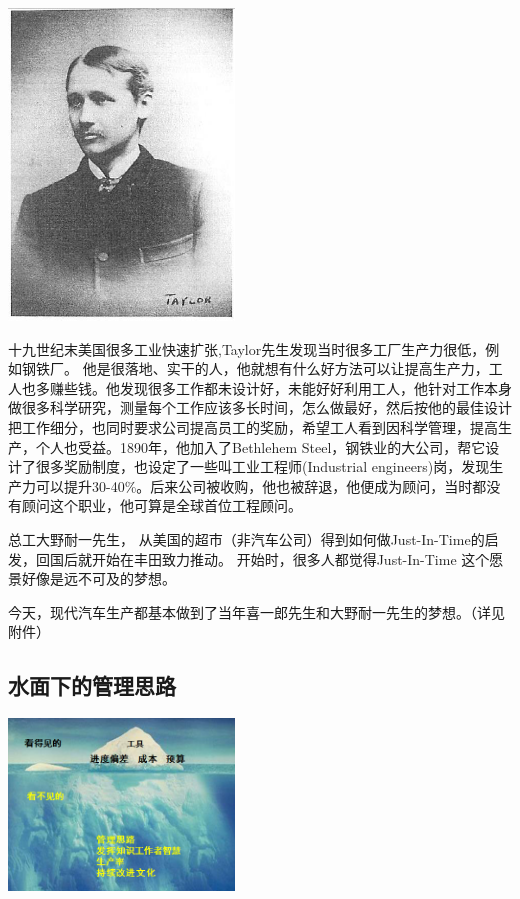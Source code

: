 {\begin{minipage}[t]{0.97\columnwidth}
\includegraphics[width=6cm]{Weisbord_P34.jpg}

十九世纪末美国很多工业快速扩张,Taylor先生发现当时很多工厂生产力很低，例如钢铁厂。
他是很落地、实干的人，他就想有什么好方法可以让提高生产力，工人也多赚些钱。他发现很多工作都未设计好，未能好好利用工人，他针对工作本身做很多科学研究，测量每个工作应该多长时间，怎么做最好，然后按他的最佳设计把工作细分，也同时要求公司提高员工的奖励，希望工人看到因科学管理，提高生产，个人也受益。1890年，他加入了Bethlehem
Steel，钢铁业的大公司，帮它设计了很多奖励制度，也设定了一些叫工业工程师(Industrial
engineers)岗，发现生产力可以提升30-40\%。后来公司被收购，他也被辞退，他便成为顾问，当时都没有顾问这个职业，他可算是全球首位工程顾问。
\strut
\end{minipage}}

总工大野耐一先生，
从美国的超市（非汽车公司）得到如何做Just-In-Time的启发，回国后就开始在丰田致力推动。
开始时，很多人都觉得Just-In-Time 这个愿景好像是远不可及的梦想。

今天，现代汽车生产都基本做到了当年喜一郎先生和大野耐一先生的梦想。（详见附件）

\hypertarget{ux6c34ux9762ux4e0bux7684ux7ba1ux7406ux601dux8def}{%
\subsection{水面下的管理思路}\label{ux6c34ux9762ux4e0bux7684ux7ba1ux7406ux601dux8def}}


\includegraphics[width=6cm]{冰山.png}

